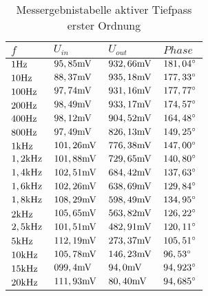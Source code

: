 \begin{table}[H]
\centering
\caption{Messergebnistabelle aktiver Tiefpass erster Ordnung}
\label{tab:TP_erg_tab}
\begin{tabular}{|l|l|l|l|}
\hline
\rowcolor[HTML]{C0C0C0} 
$f     $&$ U_{in} $&$ U_{out} $&$ Phase  $\\ \hline
$1\text{Hz}     $&$ 95,85\text{mV}  $&$ 932,66\text{mV}  $&$ 181,04^\circ $\\ \hline
$10\text{Hz}    $&$ 88,37\text{mV}  $&$ 935,18\text{mV}  $&$ 177,33^\circ $\\ \hline
$100\text{Hz}   $&$ 97,74\text{mV}  $&$ 931,16\text{mV}  $&$ 177,77^\circ $\\ \hline
$200\text{Hz}   $&$ 98,49\text{mV}  $&$ 933,17\text{mV}  $&$ 174,57^\circ $\\ \hline
$400\text{Hz}   $&$ 98,12\text{mV}  $&$ 904,52\text{mV}  $&$ 164,48^\circ $\\ \hline
$800\text{Hz}   $&$ 97,49\text{mV}  $&$ 826,13\text{mV}  $&$ 149,25^\circ $\\ \hline
$1\text{kHz}   $&$ 101,26\text{mV} $&$ 776,38\text{mV}  $&$ 147,00^\circ $\\ \hline
$1,2\text{kHz} $&$ 101,88\text{mV} $&$ 729,65\text{mV}  $&$ 140,80^\circ $\\ \hline
$1,4\text{kHz} $&$ 102,51\text{mV} $&$ 684,42\text{mV}  $&$ 137,63^\circ $\\ \hline
$1,6\text{kHz} $&$ 102,26\text{mV} $&$ 638,69\text{mV}  $&$ 129,84^\circ $\\ \hline
$1,8\text{kHz} $&$ 108,29\text{mV} $&$ 598,49\text{mV}  $&$ 134,95^\circ $\\ \hline
$2\text{kHz}   $&$ 105,65\text{mV} $&$ 563,82\text{mV}  $&$ 126,22^\circ $\\ \hline
$2,5\text{kHz} $&$ 101,51\text{mV} $&$ 482,91\text{mV}  $&$ 120,11^\circ $\\ \hline
$5\text{kHz}   $&$ 112,19\text{mV} $&$ 273,37\text{mV}  $&$ 105,51^\circ $\\ \hline
$10\text{kHz}  $&$ 105,78\text{mV} $&$ 146,23\text{mV}  $&$ 96,53^\circ  $\\ \hline
$15\text{kHz}  $&$ 099,4\text{mV}  $&$ 94,0\text{mV}    $&$ 94,923^\circ $\\ \hline
$20\text{kHz}  $&$ 111,93\text{mV} $&$ 80,40\text{mV}   $&$ 94,685^\circ $\\ \hline
\end{tabular}
\end{table}